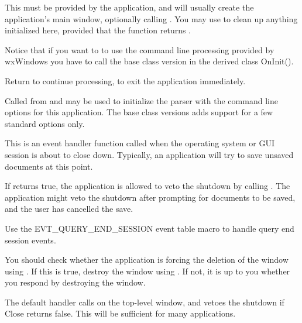 This must be provided by the application, and will usually create the
application's main window, optionally calling 
. You may use 
 to clean up anything initialized here, provided
that the function returns \true.

Notice that if you want to to use the command line processing provided by
wxWindows you have to call the base class version in the derived class
OnInit().

Return \true to continue processing, \false to exit the application
immediately.


\label{wxapponinitcmdline}


Called from  and may be used to initialize the
parser with the command line options for this application. The base class
versions adds support for a few standard options only.


\label{wxapponqueryendsession}


This is an event handler function called when the operating system or GUI session is
about to close down. Typically, an application will try to save unsaved documents
at this point.

If  returns true, the application
is allowed to veto the shutdown by calling .
The application might veto the shutdown after prompting for documents to be saved, and the
user has cancelled the save.

Use the EVT\_QUERY\_END\_SESSION event table macro to handle query end session events.

You should check whether the application is forcing the deletion of the window
using . If this is true,
destroy the window using .
If not, it is up to you whether you respond by destroying the window.

The default handler calls  on the top-level window,
and vetoes the shutdown if Close returns false. This will be sufficient for many applications.


